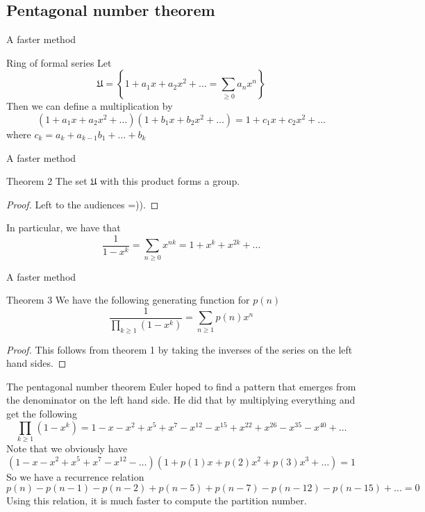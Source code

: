 \documentclass[pdf]{beamer}
\begin{document}
\subsection{Pentagonal number theorem}
\begin{frame}{A faster method}
    \begin{block}{Ring of formal series}
        Let
        \[\mathfrak{U} = \left\lbrace 1+a_1x+a_2x^2+\ldots = \sum_{\ge 0} a_nx^n\right\rbrace\]
        Then we can define a multiplication by
        \[(1+a_1x+a_2x^2+\ldots)(1+b_1x+b_2x^2+\ldots) =1+c_1x+c_2x^2+\ldots\]
        where $c_k = a_k + a_{k-1}b_1+\ldots+b_k$
    \end{block}
\end{frame}
\begin{frame}{A faster method}
    \begin{block}{Theorem 2}
        The set $\mathfrak{U}$ with this product forms a group.
    \end{block} \pause
    \begin{proof}
        Left to the audiences =)).
    \end{proof}
    In particular, we have that
    \[\dfrac{1}{1-x^k} = \sum_{n \ge 0} x^{nk} = 1+ x^k+x^{2k}+\ldots\]
\end{frame}
\begin{frame}{A faster method}
    \begin{block}{Theorem 3}
        We have the following generating function for $p(n)$
        \[
            \dfrac{1}{\prod_{k \ge 1} (1-x^k)} = \sum_{n \ge 1}p(n)x^n
        \]
    \end{block}\pause
    \begin{proof}
        This follows from theorem 1 by taking the inverses of the series on the left hand sides.
    \end{proof}
\end{frame}
\begin{frame}{The pentagonal number theorem}
    Euler hoped to find a pattern that emerges from the denominator on the left hand side. He did that by multiplying everything and get the following
    \[\prod_{k \ge 1} (1-x^k) = 1-x-x^2+x^5+x^7-x^{12}-x^{15}+x^{22}+x^{26}-x^{35}-x^{40}+\ldots\]
    \pause
    Note that we obviously have
    \[(1-x-x^2+x^5+x^7-x^{12}-\ldots)(1+p(1)x+p(2)x^2+p(3)x^3+\ldots)=1\]\pause
    So we have a recurrence relation
    \[p(n)-p(n-1)-p(n-2)+p(n-5)+p(n-7)-p(n-12)-p(n-15)+...=0\]
    Using this relation, it is much faster to compute the partition number.
\end{frame}
\end{document}
